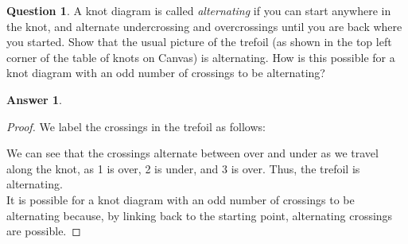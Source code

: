 \documentclass[article, 12pt]{article}
\theoremstyle{definition}
\newtheorem{question}{Question}
\newtheorem{answer}{Answer}
\begin{document}
    \begin{question}
        A knot diagram is called \textit{alternating} if you can start anywhere in the knot, and alternate undercrossing and overcrossings until you are back where you started. Show that the usual picture of the trefoil (as shown in the top left corner of the table of knots on Canvas) is alternating. How is this possible for a knot diagram with an odd number of crossings to be alternating?
    \end{question}
    \begin{answer}
        \begin{proof}
            We label the crossings in the trefoil as follows:
            \begin{figure}[H]
                \centering
            \end{figure}
        We can see that the crossings alternate between over and under as we travel along the knot, as 1 is over, 2 is under, and 3 is over. Thus, the trefoil is alternating.
        \\[12pt]
        It is possible for a knot diagram with an odd number of crossings to be alternating because, by linking back to the starting point, alternating crossings are possible.
    \end{proof}
    \end{answer}    
    
\end{document}
